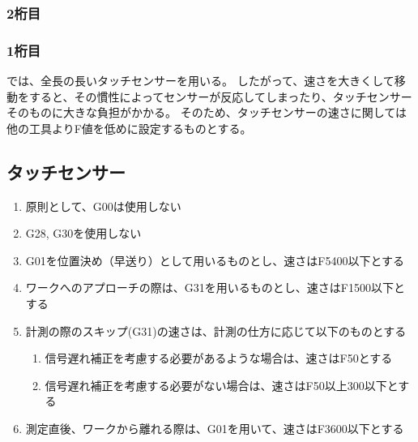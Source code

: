 \subsubsection{2桁目}



\subsubsection{1桁目}




\clearpage
\DMname では、全長の長いタッチセンサーを用いる。
したがって、速さを大きくして移動をすると、その慣性によってセンサーが反応してしまったり、タッチセンサーそのものに大きな負担がかかる。
そのため、タッチセンサーの速さに関しては他の工具よりF値を低めに設定するものとする。



\subsection{タッチセンサー}
\begin{enumerate}
\item 原則として、G00は使用しない
\item G28, G30を使用しない
\item G01を位置決め（早送り）として用いるものとし、速さはF5400以下とする
\item ワークへのアプローチの際は、G31を用いるものとし、速さはF1500以下とする
\item 計測の際のスキップ(G31)の速さは、計測の仕方に応じて以下のものとする
  \begin{enumerate}
  \item 信号遅れ補正を考慮する必要があるような場合は、速さはF50とする
  \item 信号遅れ補正を考慮する必要がない場合は、速さはF50以上300以下とする
  \end{enumerate}
\item 測定直後、ワークから離れる際は、G01を用いて、速さはF3600以下とする
\end{enumerate}




